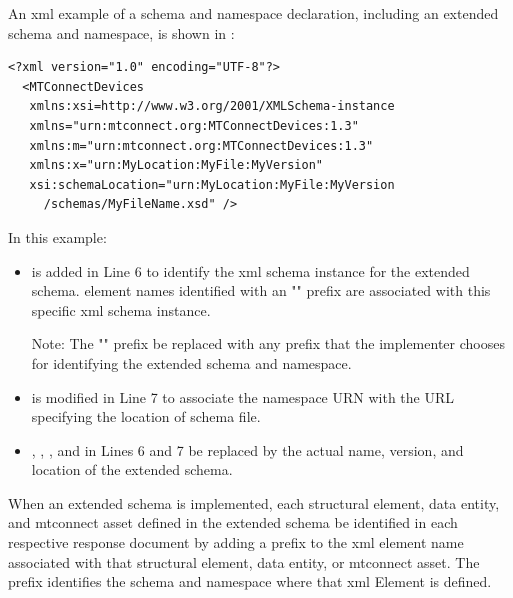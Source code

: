 \documentclass{mtconnect}	%
\begin{document}
An \gls{xml} example of a \gls{schema} and \gls{namespace} declaration, including an extended \gls{schema} and \gls{namespace}, is shown in :

\begin{lstlisting}[firstnumber=1,escapechar=|,%
caption={Example of extended schema and namespace in declaration}, label={lst:extended-schema-and-namespace-declaration}]
<?xml version="1.0" encoding="UTF-8"?>
  <MTConnectDevices
   xmlns:xsi=http://www.w3.org/2001/XMLSchema-instance
   xmlns="urn:mtconnect.org:MTConnectDevices:1.3"
   xmlns:m="urn:mtconnect.org:MTConnectDevices:1.3"
   xmlns:x="urn:MyLocation:MyFile:MyVersion"
   xsi:schemaLocation="urn:MyLocation:MyFile:MyVersion
     /schemas/MyFileName.xsd" />
\end{lstlisting}

In this example:

\begin{itemize}

\item {} is added in Line 6 to identify the \gls{xml schema} instance for the extended \gls{schema}.   \glspl{element name} identified with an "" prefix are associated with this specific \gls{xml schema} instance.

\begin{note}
Note: The "" prefix \MAY be replaced with any prefix that the implementer chooses for identifying the extended \gls{schema} and \gls{namespace}.

\end{note}

\item {} is modified in Line 7 to associate the \gls{namespace} URN with the URL specifying the location of \gls{schema} file.

\item {}, , , and  in Lines 6 and 7 \MUST be replaced by the actual name, version, and location of the extended \gls{schema}.

\end{itemize}

When an extended \gls{schema} is implemented, each \gls{structural element}, \gls{data entity}, and \gls{mtconnect asset} defined in the extended \gls{schema} \MUST be identified in each respective \gls{response document} by adding a prefix to the \gls{xml} \gls{element name} associated with that \gls{structural element}, \gls{data entity}, or \gls{mtconnect asset}.  The prefix identifies the \gls{schema} and \gls{namespace} where that \gls{xml} Element is defined. 
\end{document}
